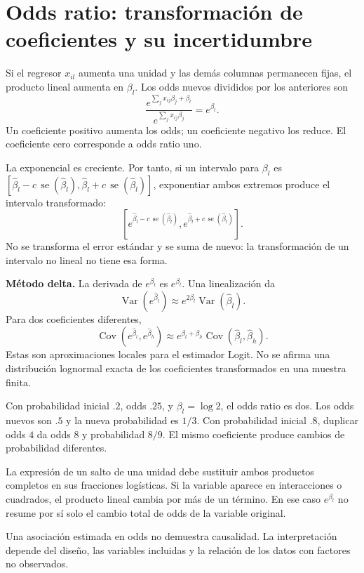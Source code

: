 \documentclass[11pt,a4paper]{article}
\DeclareMathOperator{\Var}{Var}
\DeclareMathOperator{\Cov}{Cov}
\begin{document}
\clearpage
\section{Odds ratio: transformación de coeficientes y su incertidumbre}\label{logit61}
Si el regresor $x_{il}$ aumenta una unidad y las demás
columnas permanecen fijas, el producto lineal aumenta
en $\beta_l$.
Los odds nuevos divididos por los anteriores son
\[
\frac{e^{\sum_jx_{ij}\beta_j+\beta_l}}
{e^{\sum_jx_{ij}\beta_j}}=e^{\beta_l}.
\]
Un coeficiente positivo aumenta los odds;
un coeficiente negativo los reduce.
El coeficiente cero corresponde a odds ratio uno.

La exponencial es creciente.
Por tanto, si un intervalo para $\beta_l$ es
$[\widehat\beta_l-c\,\operatorname{se}(\widehat\beta_l),
\widehat\beta_l+c\,\operatorname{se}(\widehat\beta_l)]$,
exponentiar ambos extremos produce el intervalo transformado:
\[
\left[
e^{\widehat\beta_l-c\,\operatorname{se}(\widehat\beta_l)},
e^{\widehat\beta_l+c\,\operatorname{se}(\widehat\beta_l)}
\right].
\]
No se transforma el error estándar y se suma de nuevo:
la transformación de un intervalo no lineal no tiene esa forma.

\textbf{Método delta.}
La derivada de $e^{\beta_l}$ es $e^{\beta_l}$.
Una linealización da
\[
\Var(e^{\widehat\beta_l})
\approx e^{2\beta_l}\Var(\widehat\beta_l).
\]
Para dos coeficientes diferentes,
\[
\Cov(e^{\widehat\beta_l},e^{\widehat\beta_h})
\approx e^{\beta_l+\beta_h}
\Cov(\widehat\beta_l,\widehat\beta_h).
\]
Estas son aproximaciones locales para el estimador Logit.
No se afirma una distribución lognormal exacta de los
coeficientes transformados en una muestra finita.

\begin{ejemplo}
Con probabilidad inicial $.2$, odds $.25$,
y $\beta_l=\log2$, el odds ratio es dos.
Los odds nuevos son $.5$ y la nueva probabilidad es $1/3$.
Con probabilidad inicial $.8$, duplicar odds $4$ da odds $8$
y probabilidad $8/9$.
El mismo coeficiente produce cambios de probabilidad diferentes.
\end{ejemplo}
La expresión de un salto de una unidad debe sustituir
ambos productos completos en sus fracciones logísticas.
Si la variable aparece en interacciones o cuadrados,
el producto lineal cambia por más de un término.
En ese caso $e^{\beta_l}$ no resume por sí solo
el cambio total de odds de la variable original.

Una asociación estimada en odds no demuestra causalidad.
La interpretación depende del diseño, las variables
incluidas y la relación de los datos con factores no observados.
\end{document}
